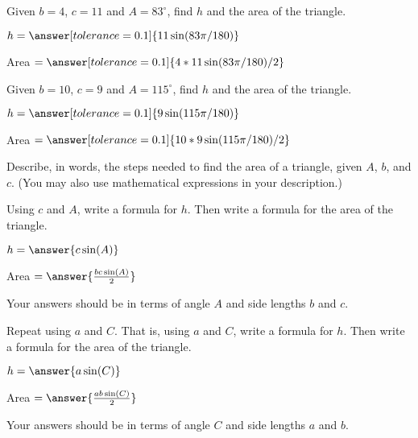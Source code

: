 \documentclass[number]{ximera}
\begin{document}
\begin{problem}
Given $b = 4$, $c=11$ and $A = 83^\circ$, find $h$ and the area of the triangle.

$h=\answer[tolerance=0.1]{11\sin(83\pi/180)}$

Area $=\answer[tolerance=0.1]{4*11\sin(83\pi/180)/2}$
\end{problem}

\begin{problem}
Given $b = 10$, $c=9$ and $A = 115^\circ$, find $h$ and the area of the triangle.

$h=\answer[tolerance=0.1]{9\sin(115\pi/180)}$

Area $=\answer[tolerance=0.1]{10*9\sin(115\pi/180)/2}$
\end{problem}

\begin{question}
Describe, in words, the steps needed to find the area of a triangle, given $A$, $b$, and $c$. (You may also use mathematical expressions in your description.)
\end{question}
\begin{freeResponse}
\end{freeResponse}

\begin{question}
Using $c$ and $A$, write a formula for $h$. Then write a formula for the area of the triangle. 
\begin{image}
\end{image}

$h=\answer{c\sin(A)}$

Area $=\answer{\frac{bc\sin(A)}{2}}$

\begin{hint}
Your answers should be in terms of angle $A$ and side lengths $b$ and $c$.
\end{hint}
\end{question}

\begin{question}
Repeat using $a$ and $C$. That is, using $a$ and $C$, write a formula for $h$. Then write a formula for the area of the triangle.

$h=\answer{a\sin(C)}$

Area $=\answer{\frac{ab\sin(C)}{2}}$

\begin{hint}
Your answers should be in terms of angle $C$ and side lengths $a$ and $b$.
\end{hint}
\end{question}
\end{document}
